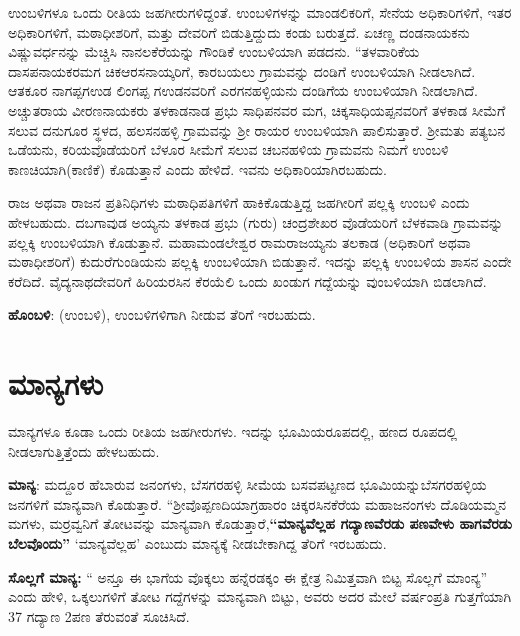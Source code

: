 ಉಂಬಳಿಗಳೂ ಒಂದು ರೀತಿಯ ಜಹಗೀರುಗಳಿದ್ದಂತೆ. ಉಂಬಳಿಗಳನ್ನು ಮಾಂಡಲಿಕರಿಗೆ, ಸೇನೆಯ ಅಧಿಕಾರಿಗಳಿಗೆ, ಇತರ ಅಧಿಕಾರಿಗಳಿಗೆ, ಮಠಾಧೀಶರಿಗೆ, ಮತ್ತು ದೇವರಿಗೆ ಬಿಡುತ್ತಿದ್ದುದು ಕಂಡು ಬರುತ್ತದೆ. ಏಚಣ್ಣ ದಂಡನಾಯಕನು ವಿಷ್ಣುವರ್ಧನನ್ನು ಮೆಚ್ಚಿಸಿ ನಾನಲಕೆರೆಯನ್ನು ಗೌಂಡಿಕೆ ಉಂಬಳಿಯಾಗಿ ಪಡದನು. “ತಳವಾರಿಕೆಯ ದಾಸಪನಾಯಕರ\break ಮಗ ಚಿಕಆರಸನಾಯ್ಕರಿಗೆ, ಕಾರಬಯಲು ಗ್ರಾಮವನ್ನು ದಂಡಿಗೆ ಉಂಬಳಿಯಾಗಿ ನೀಡಲಾಗಿದೆ. ಆತಕೂರ ನಾಗಪ್ಪಗಉಡ ಲಿಂಗಪ್ಪ ಗಉಡನವರಿಗೆ ಎರಗನಹಳ್ಳಿಯನು ದಂಡಿಗೆಯ ಉಂಬಳಿಯಾಗಿ ನೀಡಲಾಗಿದೆ. ಅಚ್ಚುತರಾಯ ವೀರಣನಾಯಕರು ತಳಕಾಡನಾಡ ಪ್ರಭು ಸಾಧಿಪನವರ ಮಗ, ಚಿಕ್ಕಸಾಧಿಯಪ್ಪನವರಿಗೆ ತಳಕಾಡ ಸೀಮೆಗೆ ಸಲುವ ದನುಗೂರ ಸ್ಥಳದ, ಹಲಸನಹಳ್ಳಿ ಗ್ರಾಮವನ್ನು ಶ‍್ರೀ ರಾಯರ ಉಂಬಳಿಯಾಗಿ ಪಾಲಿಸುತ್ತಾರೆ. ಶ‍್ರೀಮತು ಪತ್ಯಬನ ಒಡೆಯನು, ಕರಿಯವೊಡೆಯರಿಗೆ ಬೆಳೂರ ಸೀಮೆಗೆ ಸಲುವ ಚಬನಹಳಿಯ ಗ್ರಾಮವನು ನಿಮಗೆ ಉಂಬಳಿ ಕಾಣಚಿಯಾಗಿ(ಕಾಣಿಕೆ) ಕೊಡುತ್ತಾನೆ ಎಂದು ಹೇಳಿದೆ. ಇವನು ಅಧಿಕಾರಿಯಾಗಿರಬಹುದು.

ರಾಜ ಅಥವಾ ರಾಜನ ಪ್ರತಿನಿಧಿಗಳು ಮಠಾಧಿಪತಿಗಳಿಗೆ ಹಾಕಿಕೊಡುತ್ತಿದ್ದ ಜಹಗೀರಿಗೆ ಪಲ್ಲಕ್ಕಿ ಉಂಬಳಿ ಎಂದು ಹೇಳಬಹುದು. ದಬಗಾವುಡ ಅಯ್ಯನು ತಳಕಾಡ ಪ್ರಭು (ಗುರು) ಚಂದ್ರಶೇಖರ ವೊಡೆಯರಿಗೆ ಬೆಳಕವಾಡಿ ಗ್ರಾಮವನ್ನು ಪಲ್ಲಕ್ಕಿ ಉಂಬಳಿಯಾಗಿ ಕೊಡುತ್ತಾನೆ. ಮಹಾಮಂಡಲೇಶ್ವರ ರಾಮರಾಜಯ್ಯನು ತಲಕಾಡ (ಅಧಿಕಾರಿಗೆ ಅಥವಾ ಮಠಾಧೀಶರಿಗೆ) ಕುದುರೆಗುಂಡಿಯನು ಪಲ್ಲಕ್ಕಿ ಉಂಬಳಿಯಾಗಿ ಬಿಡುತ್ತಾನೆ. ಇದನ್ನು ಪಲ್ಲಕ್ಕಿ ಉಂಬಳಿಯ ಶಾಸನ ಎಂದೇ ಕರೆದಿದೆ. ವೈದ್ಯನಾಥದೇವರಿಗೆ ಹಿರಿಯರಸಿನ ಕೆರಯೆಲಿ ಒಂದು ಖಂಡುಗ ಗದ್ದೆಯನ್ನು ವುಂಬಳಿಯಾಗಿ ಬಿಡಲಾಗಿದೆ.

\textbf{ಹೊಂಬಳಿ}: (ಉಂಬಳಿ), ಉಂಬಳಿಗಳಿಗಾಗಿ ನೀಡುವ ತೆರಿಗೆ ಇರಬಹುದು.


\section{ಮಾನ್ಯಗಳು}

ಮಾನ್ಯಗಳೂ ಕೂಡಾ ಒಂದು ರೀತಿಯ ಜಹಗೀರುಗಳು. ಇದನ್ನು ಭೂಮಿಯರೂಪದಲ್ಲಿ, ಹಣದ ರೂಪದಲ್ಲಿ ನೀಡಲಾಗುತ್ತಿತ್ತೆಂದು ಹೇಳಬಹುದು.

\textbf{ಮಾನ್ಯ}: ಮದ್ದೂರ ಹೆಬಾರುವ ಜನಂಗಳು, ಬೆಸಗರಹಳ್ಳಿ ಸೀಮೆಯ ಬಸವಪಟ್ಟಣದ ಭೂಮಿಯನ್ನು\break ಬೆಸಗರಹಳ್ಳಿಯ ಜನಗಳಿಗೆ ಮಾನ್ಯವಾಗಿ ಕೊಡುತ್ತಾರೆ. “ಶ‍್ರೀವೊಪ್ಪಣದಿಯಾಗ್ರಹಾರಂ ಚಿಕ್ಕರಸಿನಕೆರೆಯ ಮಹಾಜನಂಗಳು ದೊಡಿಯಮ್ಮನ ಮಗಳು, ಮರ್ರವ್ವನಿಗೆ ತೋಟವನ್ನು ಮಾನ್ಯವಾಗಿ ಕೊಡುತ್ತಾರೆ,\textbf{“ಮಾನ್ಯವೆಲ್ಲಹ ಗದ್ಯಾಣವೆರಡು ಪಣವೇಳು ಹಾಗವೆರಡು ಬೆಲವೊಂದು”} `ಮಾನ್ಯವೆಲ್ಲಹ' ಎಂಬುದು ಮಾನ್ಯಕ್ಕೆ ನೀಡಬೇಕಾಗಿದ್ದ ತೆರಿಗೆ ಇರಬಹುದು.

\textbf{ಸೊಲ್ಲಗೆ ಮಾನ್ಯ:} “ ಅನ್ತೂ ಈ ಭಾಗೆಯ ವೊಕ್ಕಲು ಹನ್ನೆರಡಕ್ಕಂ ಈ ಕ್ಷೇತ್ರ ನಿಮಿತ್ತವಾಗಿ ಬಿಟ್ಟ ಸೊಲ್ಲಗೆ ಮಾಂನ್ಯ” ಎಂದು ಹೇಳಿ, ಒಕ್ಕಲುಗಳಿಗೆ ತೋಟ ಗದ್ದೆಗಳನ್ನು ಮಾನ್ಯವಾಗಿ ಬಿಟ್ಟು, ಅವರು ಅದರ ಮೇಲೆ ವರ್ಷಂಪ್ರತಿ ಗುತ್ತಗೆಯಾಗಿ 37 ಗದ್ಯಾಣ 2ಪಣ ತೆರುವಂತೆ ಸೂಚಿಸಿದೆ.


